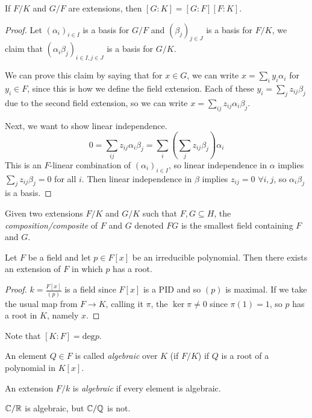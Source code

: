 \documentclass[a4paper,twoside,master.tex]{subfiles}
\begin{document}
\begin{claim}
    If $ F/K $ and $ G/F $ are extensions, then $ [G : K]=[G:F][F:K] $. 
\end{claim}
\begin{proof}
    Let $ (\alpha_i)_{i \in I} $ is a basis for $ G/F $ and $ (\beta_j)_{j \in J} $ is a basis for $ F/K $, we claim that $ (\alpha_i \beta_j)_{i \in I, j \in J} $ is a basis for $ G/K $.

    We can prove this claim by saying that for $ x \in G $, we can write $ x = \sum_i y_i \alpha_i $ for $ y_i \in F $, since this is how we define the field extension. Each of these $ y_i = \sum_j z_{ij} \beta_j $ due to the second field extension, so we can write $ x = \sum_{ij} z_{ij} \alpha_i \beta_j $.

    Next, we want to show linear independence.
    \begin{equation}
        0 = \sum_{ij} z_{ij} \alpha_i \beta_j = \sum_i (\sum_j z_{ij} \beta_j) \alpha_i
    \end{equation}
    This is an $ F $-linear combination of $ (\alpha_i)_{i \in I} $, so linear independence in $ \alpha $ implies $ \sum_j z_{ij} \beta_j = 0 $ for all $ i $. Then linear independence in $ \beta $ implies $ z_{ij} = 0 $ $ \forall i, j $, so $ \alpha_i \beta_j $ is a basis.
\end{proof}

\begin{definition}
    Given two extensions $ F/K $ and $ G/K $ such that $ F,G\subseteq H $, the \textit{composition/composite} of $ F $ and $ G $ denoted $ FG $ is the smallest field containing $ F $ and $ G $.
\end{definition}

\begin{claim}
    Let $ F $ be a field and let $ p \in F[x] $ be an irreducible polynomial. Then there exists an extension of $ F $ in which $ p $ has a root.
\end{claim}

\begin{proof}
    $ k = \frac{F[x]}{(p)} $ is a field since $ F[x] $ is a PID and so $ (p) $ is maximal. If we take the usual map from $ F \to K $, calling it $ \pi $, the $ \ker \pi \neq 0 $ since $ \pi(1) = 1 $, so $ p $ has a root in $ K $, namely $ x $.
\end{proof}
Note that $ [K:F]= \text{deg} p $. 

\begin{definition}
    An element $ Q \in F $ is called \textit{algebraic} over $ K $ (if $ F/K $) if $ Q $ is a root of a polynomial in $ K[x] $.
\end{definition}
\begin{definition}
    An extension $ F/k $ is \textit{algebraic} if every element is algebraic.
\end{definition}
\begin{ex}
    $ \mathbb{C}/\mathbb{R} $ is algebraic, but $ \mathbb{C}/\mathbb{Q} $ is not.
\end{ex}
\end{document}
